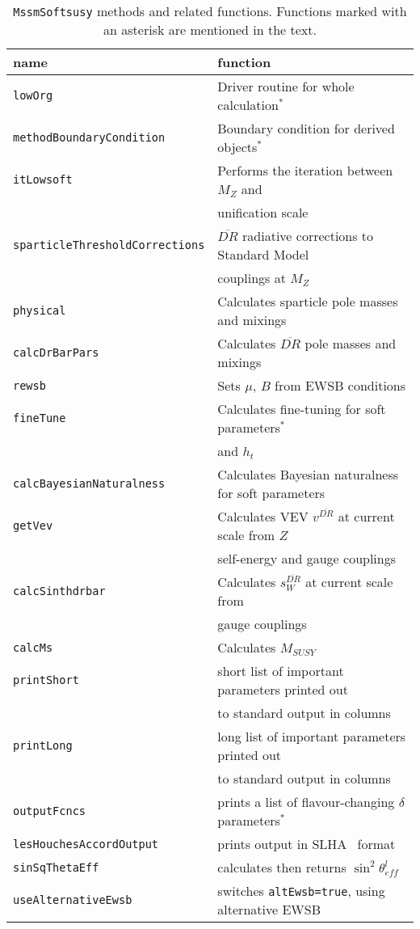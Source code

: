 \documentclass{article}
\def\code#1{\small{\tt #1}\normalsize}
\begin{document}
\begin{table}\begin{center}\begin{tabular}{ll} 
name & function \\ \hline
\code{lowOrg} & Driver routine for whole calculation$^*$\\ 
\code{methodBoundaryCondition} & Boundary condition for derived objects$^*$\\
\code{itLowsoft} & Performs the iteration between $M_Z$ and \\
 &unification scale\\  
\code{sparticleThresholdCorrections} & $\overline{DR}$ radiative corrections
to Standard Model \\
 & couplings at $M_Z$\\ 
\code{physical} & Calculates sparticle pole masses and mixings\\ 
\code{calcDrBarPars} & Calculates $\overline{DR}$ pole masses and mixings\\ 
\code{rewsb} & Sets $\mu$, $B$ from EWSB conditions\\ 
\code{fineTune} & Calculates fine-tuning for soft parameters$^*$ \\ & and
$h_t$\\ 
\code{calcBayesianNaturalness} & Calculates Bayesian naturalness for soft parameters \\ 
\code{getVev} & Calculates VEV $v^{\overline{DR}}$ at current scale from $Z$\\
 & self-energy and gauge couplings\\ 
\code{calcSinthdrbar} & Calculates $s_W^{\overline{DR}}$ at current scale
from\\  & gauge couplings \\
\code{calcMs} & Calculates $M_{SUSY}$\\ 
\code{printShort} & short list of important parameters printed out \\ &to standard
output in columns\\ 
\code{printLong} & long list of important parameters printed out \\ &to standard
output in columns\\ 
\code{outputFcncs} & prints a list of flavour-changing $\delta$
parameters$^*$\\
\code{lesHouchesAccordOutput} & prints output in SLHA~\cite{lhacc} format\\
\code{sinSqThetaEff} & calculates then returns $\sin^2\theta_{eff}^l$\\
\code{useAlternativeEwsb} & switches \code{altEwsb=true}, using alternative
EWSB \\ 
\end{tabular}
\caption{\label{tab:softmeth}\code{MssmSoftsusy} methods and related functions. Functions marked with an
asterisk are mentioned in the text.}\end{center}\end{table}
\end{document}
